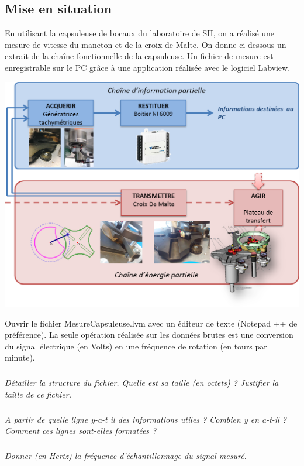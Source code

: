 \documentclass[10pt]{article}
\newif\ifxp
\begin{document}
\ifxp

\else

\fi



 \renewcommand{\baselinestretch}{1.2}
\setlength{\parskip}{2ex plus 0.5ex minus 0.2ex}



\subsection*{Mise en situation}
En utilisant la capsuleuse de bocaux du laboratoire de SII, on a réalisé une mesure de vitesse du maneton et de la croix de Malte. On donne ci-dessous un extrait de la chaîne fonctionnelle de la capsuleuse. Un fichier de mesure est enregistrable sur le PC grâce à une application réalisée avec le logiciel Labview.

\begin{center}
\includegraphics[width=.8\textwidth]{images/CE_CI}
\end{center}

Ouvrir le fichier \textsf{MesureCapsuleuse.lvm} avec un éditeur de texte (Notepad ++ de préférence). La seule opération réalisée sur les données brutes est une conversion du signal électrique (en Volts) en une fréquence de rotation (en tours par minute).


\subparagraph{}
\textit{Détailler la structure du fichier. Quelle est sa taille (en octets) ? Justifier la taille de ce fichier.}

\subparagraph{}
\textit{A partir de quelle ligne y-a-t il des informations utiles ? Combien y en a-t-il ? Comment ces lignes sont-elles formatées ?}

\subparagraph{}
\textit{Donner (en Hertz) la fréquence d'échantillonnage du signal mesuré.}
\end{document}
